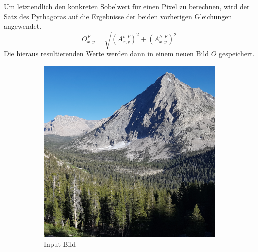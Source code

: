 \documentclass[course=erap]{aspdoc}
\begin{document}
Um letztendlich den konkreten Sobelwert für einen Pixel zu berechnen, wird der Satz des Pythagoras auf die Ergebnisse der beiden vorherigen Gleichungen angewendet.
\begin{equation}
    O^{F}_{x,y} = \sqrt{(A^{v,F}_{x,y})^2 + (A^{h,F}_{x,y})^2}
    \label{eq:wurzel}
\end{equation}
Die hieraus resultierenden Werte werden dann in einem neuen Bild $O$ gespeichert.
\begin{figure}[H]
    \begin{subfigure}{.5\columnwidth}
        \centering
        \includegraphics[width=\columnwidth]{graphics/johnmuirtrail}
        \caption{Input-Bild}
        \label{fig:input-bild}
    \end{subfigure}
    \begin{subfigure}{.5\columnwidth}
        \centering

\end{subfigure}
\end{figure}
\end{document}
